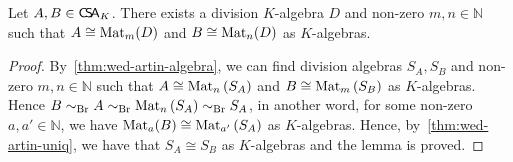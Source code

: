 \begin{lemma}
  \label{lem:common-div-alg}
Let $A, B \in \operatorname{\mathsf{C}\!\mathsf{S}\!\mathsf{A}}_{K}$. There exists a division $K$-algebra $D$ and non-zero $m,n\in\mathbb{N}$ such that $A\cong\operatorname{Mat}_{m}(D)$ and $B\cong\operatorname{Mat}_{n}(D)$ as $K$-algebras.
  \leanok
\end{lemma}

\begin{proof}
  By~\cref{thm:wed-artin-algebra}, we can find division algebras $S_{A}, S_{B}$ and non-zero $m, n\in\mathbb{N}$ such that $A\cong\operatorname{Mat}_{n}\left(S_{A}\right)$ and $B\cong\operatorname{Mat}_{m}\left(S_{B}\right)$ as $K$-algebras. Hence $B\sim_{\operatorname{Br}}A\sim_{\operatorname{Br}}\operatorname{Mat}_{n}\left(S_{A}\right)\sim_{\operatorname{Br}}S_{A}$, in another word, for some non-zero $a, a'\in\mathbb{N}$, we have $\operatorname{Mat}_{a}(B)\cong\operatorname{Mat}_{a'}\left(S_{A}\right)$ as $K$-algebras. Hence, by~\cref{thm:wed-artin-uniq}, we have that $S_{A}\cong S_{B}$ as $K$-algebras and the lemma is proved.
\end{proof}

